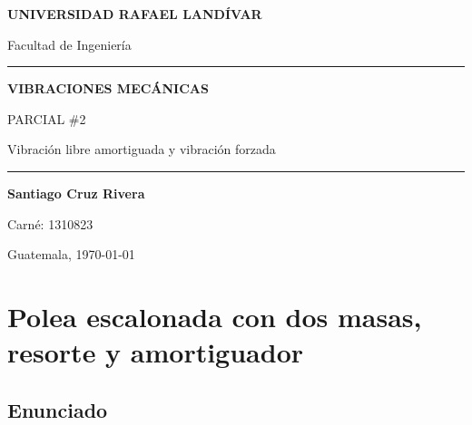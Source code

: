 \documentclass[12pt,letterpaper]{article}
\begin{document}
\begin{titlepage}
\centering
\thispagestyle{empty}

\vspace*{1.5cm}

{\LARGE\bfseries UNIVERSIDAD RAFAEL LANDÍVAR\par}
\vspace{0.4cm}
{\large Facultad de Ingeniería\par}

\vspace{2.5cm}

\rule{\textwidth}{1.2pt}
\vspace{0.6cm}

{\Huge\bfseries VIBRACIONES MECÁNICAS\par}
\vspace{0.8cm}
{\LARGE PARCIAL \#2\par}
\vspace{0.5cm}
{\Large Vibración libre amortiguada y vibración forzada\par}

\vspace{0.6cm}
\rule{\textwidth}{1.2pt}

\vspace{3cm}

{\Large\bfseries Santiago Cruz Rivera\par}
\vspace{0.4cm}
{\large Carné: 1310823\par}

\vfill

{\large Guatemala, \today\par}

\end{titlepage}

\tableofcontents
\newpage

\section{Polea escalonada con dos masas, resorte y amortiguador}

\subsection{Enunciado}
\end{document}
